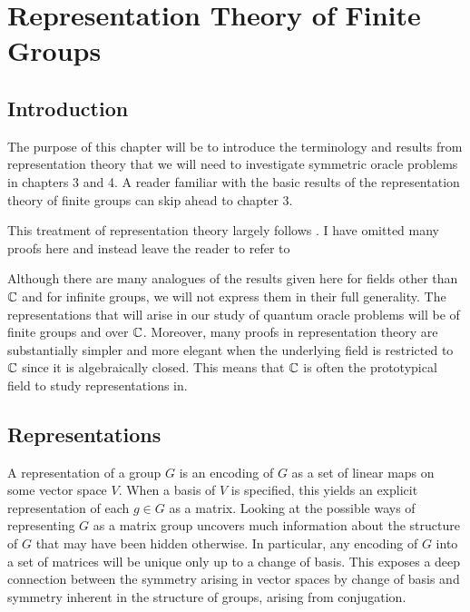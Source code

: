 
\chapter{Representation Theory of Finite Groups}

\section{Introduction}



The purpose of this chapter will be to introduce the terminology and results from representation theory that we 
will need to investigate symmetric oracle problems in chapters 3 and 4. A reader familiar with the basic results of 
the representation theory of finite groups can skip ahead to chapter 3. 

This treatment of representation theory largely follows \cite{James&Liebeck}. I have omitted many proofs here and 
instead leave the reader to refer to \cite{James&Liebeck}

Although there are many analogues of the results given here for fields other than $\mathbb{C}$ and for infinite groups, we 
will not express them in their full generality. The representations that will arise in our study of quantum oracle 
problems will be of finite groups and over $\mathbb{C}$. Moreover, many proofs in representation theory are substantially 
simpler and more elegant when the underlying field is restricted to $\mathbb{C}$ since it is algebraically closed. This 
means that $\mathbb{C}$ is often the prototypical field to study representations in.

\section{Representations}

A representation of a group $G$ is an encoding of $G$ as a set of linear maps on some vector space $V$. When a 
basis of $V$ is specified, this yields an explicit representation of each $g \in G$ as a matrix. Looking at the 
possible ways of representing $G$ as a matrix group uncovers much information about the structure of $G$ that may 
have been hidden otherwise. In particular, any encoding of $G$ into a set of matrices will be unique only up to a 
change of basis. This exposes a deep connection between the symmetry arising in vector spaces by change of basis 
and symmetry inherent in the structure of groups, arising from conjugation.


